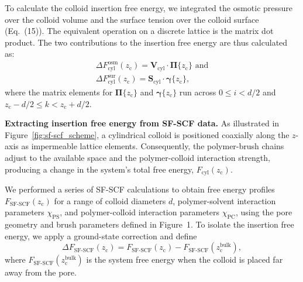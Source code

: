 \documentclass[10pt, a4paper, twocolumn]{article}
\begin{document}
To calculate the colloid insertion free energy, we integrated the osmotic pressure over the colloid volume and the surface tension over the colloid surface (Eq.~(15)).
The equivalent operation on a discrete lattice is the matrix dot product.
The two contributions to the insertion free energy are thus calculated as:
\begin{equation}
    \label{eq:cyl_fe_osm}
    \begin{split}
        \Delta F_{\text{cyl}}^{\text{osm}}(z_{\text{c}}) = \bm{V}_{\text{cyl}} \cdot \boldsymbol{\Pi}\{z_{\text{c}}\} \text{ and} \\
        \Delta F_{\text{cyl}}^{\text{sur}}(z_{\text{c}}) = \bm{S}_{\text{cyl}} \cdot \boldsymbol{\gamma}\{z_{\text{c}}\},
    \end{split}
\end{equation}
where the matrix elements for $\boldsymbol{\Pi}\{z_{\text{c}}\}$ and $\boldsymbol{\gamma}\{z_{\text{c}}\}$ run across $0 \leq i < d/2$ and $z_{\text{c}} - d/2 \leq k < z_{\text{c}} + d/2$.


\bigskip\noindent
\textbf{Extracting insertion free energy from SF-SCF data.}
As illustrated in Figure~\ref{fig:sf-scf_scheme}, a cylindrical colloid is positioned coaxially along the $z$-axis as impermeable lattice elements.
Consequently, the polymer-brush chains adjust to the available space and the polymer-colloid interaction strength, producing a change in the system's total free energy, $F_{\text{cyl}}(z_{\text{c}})$.

We performed a series of SF-SCF calculations to obtain free energy profiles $F_{\text{SF-SCF}}(z_{\text{c}})$ for a range of colloid diameters $d$, polymer-solvent interaction parameters $\chi_{\text{PS}}$, and polymer-colloid interaction parameters $\chi_{\text{PC}}$, using the pore geometry and brush parameters defined in Figure~1.  
To isolate the insertion free energy, we apply a ground-state correction and define
\begin{equation}
    \Delta F_{\text{SF-SCF}}(z_{\text{c}}) 
    = F_{\text{SF-SCF}}(z_{\text{c}}) - F_{\text{SF-SCF}}(z_{\text{c}}^{\text{bulk}}),
\end{equation}
where $F_{\text{SF-SCF}}(z_{\text{c}}^{\text{bulk}})$ is the system free energy when the colloid is placed far away from the pore.%
\end{document}
